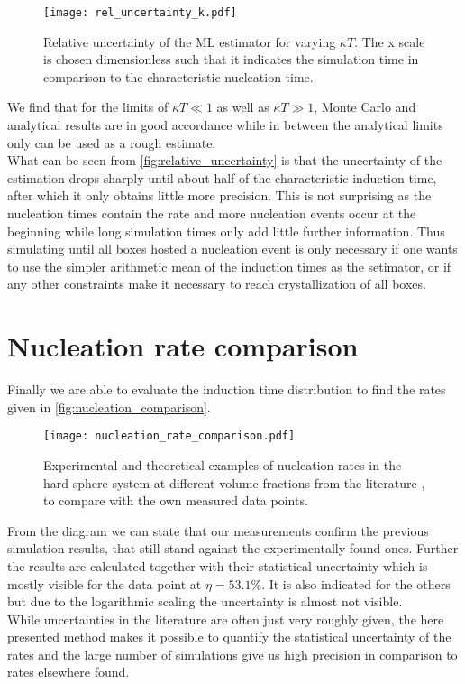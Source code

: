 \begin{figure}[ht]
\begin{center}
\texttt{[image: rel\_uncertainty\_k.pdf]}
\caption[Nucleation rate uncertainty depending on measurement time]{Relative uncertainty of the ML estimator for varying $\kappa T$. The x scale is chosen dimensionless such that it indicates the simulation time in comparison to the characteristic nucleation time.}
\label{fig:relative_uncertainty}
\end{center}
\end{figure}

We find that for the limits of $\kappa T \ll 1$ as well as $\kappa T \gg 1$, Monte Carlo and analytical results are in good accordance while in between the analytical limits only can be used as a rough estimate.\\

What can be seen from \autoref{fig:relative_uncertainty} is that the uncertainty of the estimation drops sharply until about half of the characteristic induction time, after which it only obtains little more precision. This is not surprising as the nucleation times contain the rate and more nucleation events occur at the beginning while long simulation times only add little further information. Thus simulating until all boxes hosted a nucleation event is only necessary if one wants to use the simpler arithmetic mean of the induction times as the setimator, or if any other constraints make it necessary to reach crystallization of all boxes.

\section{Nucleation rate comparison}
\label{sec:nucleation_rates}
Finally we are able to evaluate the induction time distribution to find the rates given in \autoref{fig:nucleation_comparison}.

\begin{figure}[h!]
\centering
\texttt{[image: nucleation\_rate\_comparison.pdf]}
\caption[Nucleation rate comparison with literature values]{Experimental and theoretical examples of nucleation rates in the hard sphere system at different volume fractions from the literature , to compare with the own measured data points.}
\label{fig:nucleation_comparison}
\end{figure}

From the diagram we can state that our measurements confirm the previous simulation results, that still stand against the experimentally found ones. Further the results are calculated together with their statistical uncertainty which is mostly visible for the data point at $\eta = 53.1 \%$. It is also indicated for the others but due to the logarithmic scaling the uncertainty is almost not visible.\\
While uncertainties in the literature are often just very roughly given, the here presented method makes
it possible to quantify the statistical uncertainty of the rates and the large number of simulations give us high precision in comparison to rates elsewhere found. 

